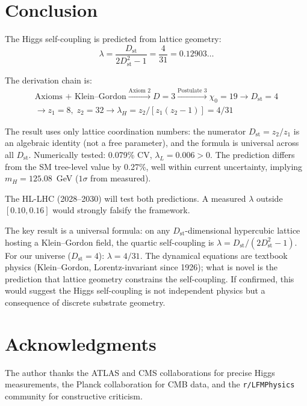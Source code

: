 \documentclass[12pt,a4paper]{article}
\newcommand{\chizero}{\chi_0}
\newcommand{\Dst}{D_{\mathrm{st}}}
\begin{document}
\section{Conclusion}\label{sec:conclusion}

The Higgs self-coupling is predicted from lattice geometry:
\begin{equation}
\lambda = \frac{\Dst}{2\Dst^2 - 1} = \frac{4}{31} = 0.12903\ldots
\end{equation}

The derivation chain is:
\begin{multline}
\text{Axioms + Klein--Gordon} \xrightarrow{\text{Axiom 2}} D = 3 \xrightarrow{\text{Postulate 3}} \chizero = 19 \to \Dst = 4 \\
\to z_1 = 8,\; z_2 = 32 \to \lambda_H = z_2/[z_1(z_2 - 1)] = 4/31
\end{multline}

The result uses only lattice coordination numbers: the numerator $\Dst = z_2/z_1$ is an algebraic identity (not a free parameter), and the formula is universal across all $\Dst$. Numerically tested: 0.079\% CV, $\lambda_L = 0.006 > 0$. The prediction differs from the SM tree-level value by 0.27\%, well within current uncertainty, implying $m_H = 125.08$~GeV ($1\sigma$ from measured).

The HL-LHC (2028--2030) will test both predictions. A measured $\lambda$ outside $[0.10, 0.16]$ would strongly falsify the framework.

The key result is a universal formula: on any $\Dst$-dimensional hypercubic lattice hosting a Klein--Gordon field, the quartic self-coupling is $\lambda = \Dst/(2\Dst^2 - 1)$. For our universe ($\Dst = 4$): $\lambda = 4/31$. The dynamical equations are textbook physics (Klein--Gordon, Lorentz-invariant since 1926); what is novel is the prediction that lattice geometry constrains the self-coupling. If confirmed, this would suggest the Higgs self-coupling is not independent physics but a consequence of discrete substrate geometry.


\section*{Acknowledgments}

The author thanks the ATLAS and CMS collaborations for precise Higgs measurements, the Planck collaboration for CMB data, and the \texttt{r/LFMPhysics} community for constructive criticism.
\end{document}
